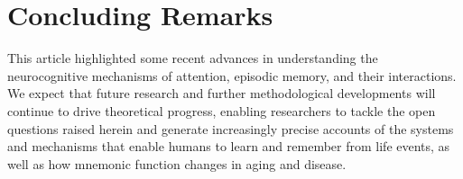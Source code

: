 \section{Concluding Remarks}

This article highlighted some recent advances in understanding the neurocognitive mechanisms of attention, episodic memory, and their interactions. We expect that future research and further methodological developments will continue to drive theoretical progress, enabling researchers to tackle the open questions raised herein and generate increasingly precise accounts of the systems and mechanisms that enable humans to learn and remember from life events, as well as how mnemonic function changes in aging and disease.
